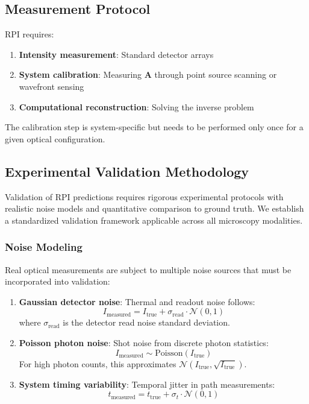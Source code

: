 \documentclass[twocolumn,10pt,a4paper]{article}
\begin{document}
\subsection{Measurement Protocol}

RPI requires:
\begin{enumerate}
    \item \textbf{Intensity measurement}: Standard detector arrays
    \item \textbf{System calibration}: Measuring $\mathbf{A}$ through point source scanning or wavefront sensing
    \item \textbf{Computational reconstruction}: Solving the inverse problem
\end{enumerate}

The calibration step is system-specific but needs to be performed only once for a given optical configuration.

\subsection{Experimental Validation Methodology}

Validation of RPI predictions requires rigorous experimental protocols with realistic noise models and quantitative comparison to ground truth. We establish a standardized validation framework applicable across all microscopy modalities.

\subsubsection{Noise Modeling}

Real optical measurements are subject to multiple noise sources that must be incorporated into validation:

\begin{enumerate}
    \item \textbf{Gaussian detector noise}: Thermal and readout noise follows:
    \begin{equation}
    I_{\text{measured}} = I_{\text{true}} + \sigma_{\text{read}} \cdot \mathcal{N}(0, 1)
    \end{equation}
    where $\sigma_{\text{read}}$ is the detector read noise standard deviation.

    \item \textbf{Poisson photon noise}: Shot noise from discrete photon statistics:
    \begin{equation}
    I_{\text{measured}} \sim \text{Poisson}(I_{\text{true}})
    \end{equation}
    For high photon counts, this approximates $\mathcal{N}(I_{\text{true}}, \sqrt{I_{\text{true}}})$.

    \item \textbf{System timing variability}: Temporal jitter in path measurements:
    \begin{equation}
    t_{\text{measured}} = t_{\text{true}} + \sigma_t \cdot \mathcal{N}(0, 1)
    \end{equation}
\end{enumerate}
\end{document}
